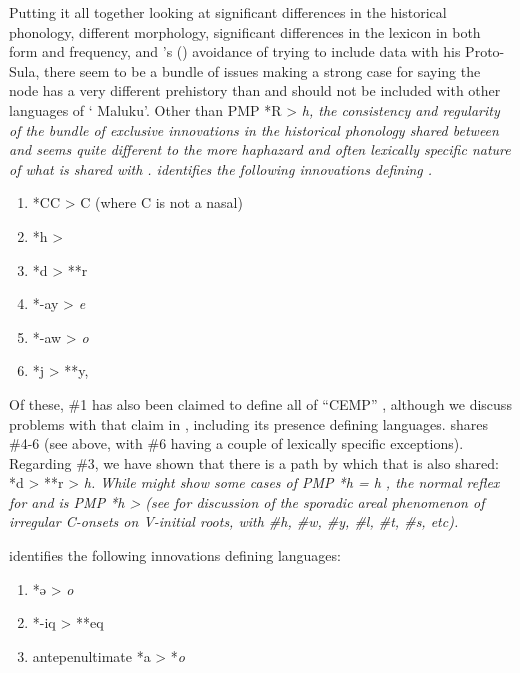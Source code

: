 Putting it all together looking at significant differences in
the historical phonology, different morphology, significant differences in the lexicon
in both form and frequency, and \citeauthor{Bloyd2015}'s (\citeyear{Bloyd2015,Bloyd2020})
avoidance of trying to include
 data with his Proto-Sula,
there seem to be a bundle of issues making a strong case for
saying the  node has a very different prehistory
than  and should not be included with other languages of ‘ Maluku’.
Other than PMP *R > \it{h},
the consistency and regularity of the bundle of exclusive innovations
in the historical phonology shared between 
and  seems quite different to the more haphazard
and often lexically specific nature of what is shared with .
\citet{Mead2003a} identifies the following innovations defining
. 

\begin{enumerate}[noitemsep]
		\item	*CC\sub{2} > C (where C is not a nasal)
		\item	*h > {\0}
		\item	*d > **r
		\item	*-ay > \it{e}
		\item	*-aw > \it{o}
		\item	*j > **y, {\0}
\end{enumerate}

Of these, {\#}1 has also been claimed to define all of “CEMP”
\citep[246]{Blust1993}, although we discuss problems with that claim in ,
including its presence defining  languages.
 shares {\#}4-6 (see  above,
with {\#}6 having a couple of lexically specific exceptions).
Regarding {\#}3, we have shown that there is a path by which
that is also shared: *d > **r > \it{h}.
While  might show some cases of PMP *h = \it{h} \citep{Blust1981},
the normal reflex for 
and  is PMP *h > {\0} (see  for discussion
of the sporadic areal phenomenon of irregular C-onsets on V-initial
roots, with {\#}h, {\#}w, {\#}y, {\#}l, {\#}t, {\#}s, etc).

\citet{Mead2003a,Mead2003b} identifies the following innovations defining
 languages: 

\begin{enumerate}[noitemsep]
	\item	*ə > \it{o}
	\item	*-iq > **eq
	\item	antepenultimate *a > *\it{o}
\end{enumerate}

